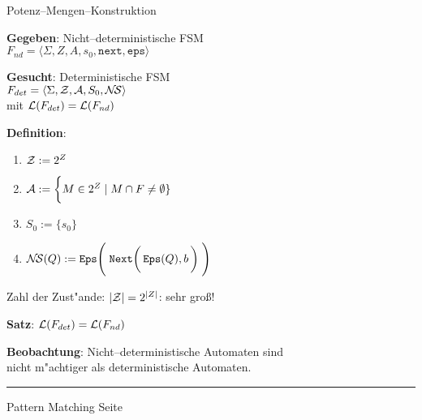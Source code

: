 
\begin{slide}{}
\normalsize

\begin{center}
Potenz--Mengen--Konstruktion
\end{center}
\vspace*{0.5cm}

\footnotesize
\textbf{Gegeben}: Nicht--deterministische FSM \\[0.3cm]
\hspace*{1.3cm} $F_{nd} = \langle \Sigma, Z, A, s_0, \mathtt{next}, \mathtt{eps}  \rangle$ 

\textbf{Gesucht}: Deterministische FSM \\[0.3cm]
\hspace*{1.3cm} $F_{det} = \langle \Sigma, {\cal Z}, {\cal A}, S_0, {\cal N\!S}  \rangle$  \\[0.3cm]
mit ${\cal L}(F_{det}) = {\cal L}(F_{nd})$

\textbf{Definition}:
\begin{enumerate}
\item ${\cal Z} := 2^Z$
\item ${\cal A} := \bigg\{ M \in 2^Z \;|\; M \cap F \not = \emptyset \}$
\item $S_0 := \{s_0\}$
\item ${\cal N\!S}(Q) := \mathtt{Eps}\Bigg(\; \mathtt{Next}\bigg(\, \mathtt{Eps}(Q), b \,\bigg) \;\Bigg)$
\end{enumerate}
Zahl der Zust"ande: $|{\cal Z}| = 2^{|Z|}$: sehr gro{\ss}!

\textbf{Satz}:  ${\cal L}(F_{det}) = {\cal L}(F_{nd})$

\textbf{Beobachtung}: Nicht--deterministische Automaten sind \\
nicht m"achtiger als deterministische Automaten.

\vspace*{\fill}
\tiny \addtocounter{mypage}{1}
\rule{17cm}{1mm}
Pattern Matching \hspace*{\fill} Seite 
\end{slide}


